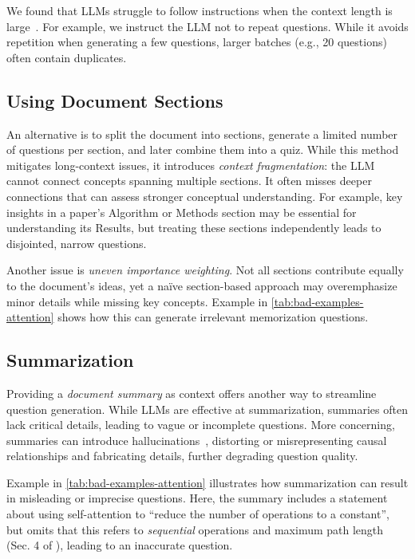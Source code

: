 We found that LLMs struggle to follow instructions when the context length is large~\cite{gao2024insights}. For example, we instruct the LLM not to repeat questions. While it avoids repetition when generating a few questions, larger batches (e.g., 20 questions) often contain duplicates. 


\subsection{Using Document Sections}
\label{sec:insights-section-context}

An alternative is to split the document into sections, generate a limited number of questions per section, and later combine them into a quiz. While this method mitigates long-context issues, it introduces {\em context fragmentation}: the LLM cannot connect concepts spanning multiple sections. It often misses deeper connections that can assess stronger conceptual understanding. For example, key insights in a paper’s Algorithm or Methods section may be essential for understanding its Results, but treating these sections independently leads to disjointed, narrow questions.

Another issue is {\em uneven importance weighting}. Not all sections contribute equally to the document’s  ideas, yet a naïve section-based approach may overemphasize minor details while missing key concepts. Example  in \autoref{tab:bad-examples-attention} shows how this can generate irrelevant memorization questions.


\subsection{Summarization}
\label{sec:insights-summary}

Providing a {\em document summary} as context offers another way to streamline question generation. While LLMs are effective at summarization, summaries often lack critical details, leading to vague or incomplete questions. More concerning, summaries can introduce hallucinations~\citep{llm_hallucination}, distorting or misrepresenting causal relationships and fabricating details, further degrading question quality.

Example  in \autoref{tab:bad-examples-attention} illustrates how summarization can result in misleading or imprecise questions. Here, the summary includes a statement about using self-attention to ``reduce the number of operations to a constant'', but omits that this refers to {\em sequential} operations and maximum path length (Sec. 4 of \citep{attention_is_all_you_need}), leading to an inaccurate question. 



